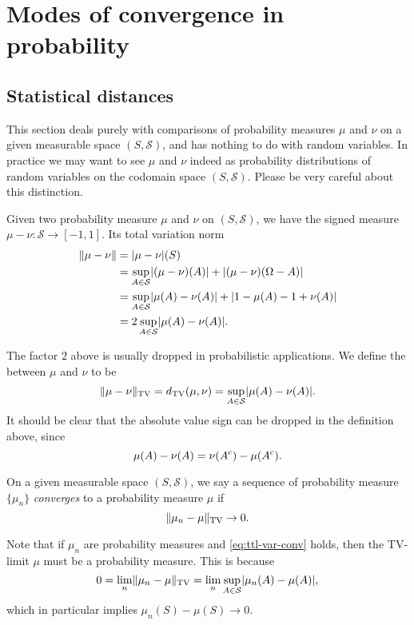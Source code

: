 \chapter{Modes of convergence in probability}
\section{Statistical distances}
\begin{namedthm*}
    This section deals purely with comparisons of probability measures $\mu$ and $\nu$ on a given measurable space $(S,\mathcal S)$, and has nothing to do with random variables. In practice we may want to see $\mu$ and $\nu$ indeed as probability distributions of random variables on the codomain space $(S,\mathcal S)$. Please be very careful about this distinction.
\end{namedthm*}

Given two probability measure $\mu$ and $\nu$ on $(S,\mathcal S)$, we have the signed measure $\mu - \nu \colon \mathcal S \to [-1,1]$. Its total variation norm \begin{align*}
    \lVert \mu - \nu \rVert & = \lvert \mu-\nu \rvert(S) \\
    & = \sup_{A\in \mathcal S}\lvert (\mu-\nu)(A) \rvert + \lvert (\mu-\nu)(\Omega - A) \rvert \\
    & = \sup_{A \in \mathcal S} \lvert \mu(A) - \nu(A) \rvert + \lvert 1 - \mu(A) - 1 + \nu(A) \rvert \\
    & = 2\sup_{A\in \mathcal S}\lvert \mu(A) - \nu(A) \rvert.
\end{align*}

The factor $2$ above is usually dropped in probabilistic applications. We define the  between $\mu$ and $\nu$ to be \[
    \lVert \mu-\nu \rVert_{\mathrm{TV}} = d_\mathrm{TV}(\mu,\nu) = \sup_{A \in \mathcal S} \lvert \mu(A) - \nu(A) \rvert.
\] It should be clear that the absolute value sign can be dropped in the definition above, since \[\mu(A) - \nu(A) = \nu(A^{\mathrm{c}}) - \mu(A^{\mathrm{c}}).\]

\begin{defn}
    On a given measurable space $(S,\mathcal S)$, we say a sequence of probability measure $\{\mu_n\}$ \emph{converges} to a probability measure $\mu$  if \begin{equation}
        \lVert \mu_n -\mu \rVert_{\mathrm{TV}} \to 0. \label{eq:ttl-var-conv}
    \end{equation}
\end{defn}
Note that if $\mu_n$ are probability measures and \eqref{eq:ttl-var-conv} holds, then the TV-limit $\mu$ must be a probability measure. This is because \[
    0 = \lim_n \lVert \mu_n -\mu \rVert_{\mathrm{TV}} = \lim_n \sup_{A\in \mathcal S} \lvert \mu_n(A) - \mu(A) \rvert,
\] which in particular implies $\mu_n (S) - \mu(S) \to 0$.

